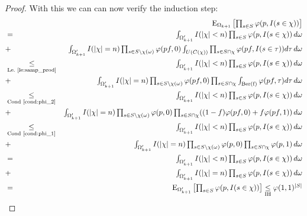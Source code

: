 \documentclass{article}
\newcommand{\expectation}{\mathrm{E}}
\renewcommand{\phi}{\varphi}
\theoremstyle{definition}
\begin{document}
\begin{proof}
With this we can can now verify the induction step:
\begin{eqnarray*}
&  & \textstyle\expectation_{\Omega_{k+1}}\left[\prod_{s \in S} \phi(p, I(s \in \chi))\right]  \\
& = & \textstyle \int_{\Omega'_{k+1}} I(|\chi| < n)\prod_{s \in S} \phi(p, I(s \in \chi)) \, d \omega \\
& + & \textstyle \int_{\Omega'_{k+1}} I(|\chi| = n) \prod_{s \in S \setminus \chi(\omega)} \phi(pf,0) \int_{U(C(\chi))} \prod_{s \in S \cap \chi} \phi(pf,I(s \in \tau )) d \tau \, d \omega  \\
& \underset{\textrm{Le.~\ref{le:samp_prod}}}{\leq} & \textstyle \int_{\Omega'_{k+1}} I(|\chi| < n)\prod_{s \in S} \phi(p, I(s \in \chi)) \, d \omega \\
& + & \textstyle \int_{\Omega'_{k+1}} I(|\chi| = n) \prod_{s \in S \setminus \chi(\omega)} \phi(pf,0) \prod_{s \in S \cap \chi} \int_{\mathrm{Ber(f)}} \phi(pf,\tau) d \tau \, d \omega  \\
& \underset{\textrm{Cond~\ref{cond:phi_2}}}{\leq} & \textstyle \int_{\Omega'_{k+1}} I(|\chi| < n)\prod_{s \in S} \phi(p, I(s \in \chi)) \, d \omega \\
& + & \textstyle \int_{\Omega'_{k+1}} I(|\chi| = n) \prod_{s \in S \setminus \chi(\omega)} \phi(p,0) \prod_{s \in S \cap \chi} ((1-f)\phi(pf,0)+f\phi(pf,1)) \, d \omega  \\
& \underset{\textrm{Cond~\ref{cond:phi_1}}}{\leq} & \textstyle \int_{\Omega'_{k+1}} I(|\chi| < n)\prod_{s \in S} \phi(p, I(s \in \chi)) \, d \omega \\
& + & \textstyle \int_{\Omega'_{k+1}} I(|\chi| = n) \prod_{s \in S \setminus \chi(\omega)} \phi(p,0) \prod_{s \in S \cap \chi} \phi(p,1) \, d \omega \\
& = & \textstyle \int_{\Omega'_{k+1}} I(|\chi| < n)\prod_{s \in S} \phi(p, I(s \in \chi)) \, d \omega \\
& + & \textstyle \int_{\Omega'_{k+1}} I(|\chi| = n) \prod_{s \in S} \phi(p, I(s \in \chi)) \, d \omega  \\
& = & \textstyle \expectation_{\Omega'_{k+1}}\left[\prod_{s \in S} \phi(p, I(s \in \chi)) \right] \underset{\textrm{IH}}{\leq} \phi(1,1)^{|S|}
\end{eqnarray*}

\end{proof}
\end{document}
